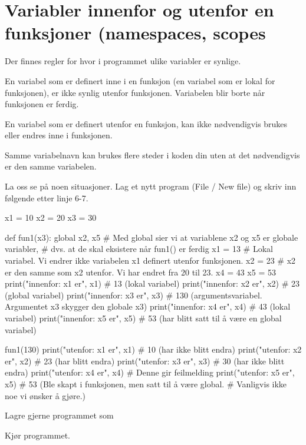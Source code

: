 \section{Variabler innenfor og utenfor en funksjoner (namespaces, scopes}

Der finnes regler for hvor i programmet ulike variabler er synlige. 

En variabel som er definert inne i en funksjon (en variabel som er lokal for funksjonen), er ikke synlig utenfor funksjonen. Variabelen blir borte når funksjonen er ferdig. 

En variabel som er definert utenfor en funksjon, kan ikke nødvendigvis brukes eller endres inne i funksjonen. 

Samme variabelnavn kan brukes flere steder i koden din uten at det nødvendigvis er den samme variabelen.

La oss se på noen situasjoner. Lag et nytt program (File / New file) og skriv inn følgende etter linje 6-7.

\begin{usncodebox}
x1 = 10
x2 = 20
x3 = 30

def fun1(x3):
    global x2, x5   # Med global sier vi at variablene x2 og x5 er globale variabler,  
                    # dvs. at de skal eksistere når fun1() er ferdig
    x1 = 13   # Lokal variabel. Vi endrer ikke variabelen x1 definert utenfor funksjonen. 
    x2 = 23   # x2 er den samme som x2 utenfor. Vi har endret fra 20 til 23. 
    x4 = 43
    x5 = 53
    print("innenfor: x1 er", x1)  #  13 (lokal variabel)
    print("innenfor: x2 er", x2)  #  23 (global variabel)
    print("innenfor: x3 er", x3)  # 130 (argumentsvariabel. Argumentet x3 skygger den globale x3)
    print("innenfor: x4 er", x4)  #  43 (lokal variabel)
    print("innenfor: x5 er", x5)  #  53 (har blitt satt til å være en global variabel)

fun1(130)
print("utenfor: x1 er", x1)   # 10 (har ikke blitt endra)
print("utenfor: x2 er", x2)   # 23 (har blitt endra)
print("utenfor: x3 er", x3)   # 30 (har ikke blitt endra)
print("utenfor: x4 er", x4)   # Denne gir feilmelding 
print("utenfor: x5 er", x5)   # 53 (Ble skapt i funksjonen, men satt til å være global. 
                              # Vanligvis ikke noe vi ønsker å gjøre.) 

\end{usncodebox}

Lagre gjerne programmet som 

Kjør programmet.

